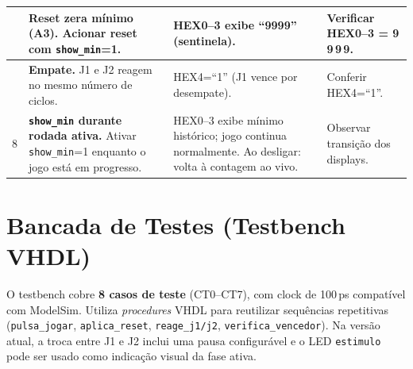 \documentclass[12pt,a4paper]{article}
\begin{document}
\begin{longtable}{>{\centering}p{0.5cm}
                  p{4.1cm} p{4.1cm} p{4.3cm}}
6 & \textbf{Reset zera mínimo (A3).} Acionar reset com
    \texttt{show\_min}=1.
  & HEX0--3 exibe ``9999'' (sentinela).
  & Verificar HEX0--3 = 9\,9\,9\,9. \\
\midrule

7 & \textbf{Empate.} J1 e J2 reagem no mesmo número de ciclos.
  & HEX4=``1'' (J1 vence por desempate).
  & Conferir HEX4=``1''. \\
\midrule

8 & \textbf{\texttt{show\_min} durante rodada ativa.} Ativar
    \texttt{show\_min}=1 enquanto o jogo está em progresso.
  & HEX0--3 exibe mínimo histórico; jogo continua normalmente.
    Ao desligar: volta à contagem ao vivo.
  & Observar transição dos displays. \\

\end{longtable}

\section{Bancada de Testes (Testbench VHDL)}

O testbench cobre \textbf{8 casos de teste} (CT0--CT7), com clock de 100\,ps
compatível com ModelSim. Utiliza \textit{procedures} VHDL para reutilizar
sequências repetitivas (\texttt{pulsa\_jogar}, \texttt{aplica\_reset},
\texttt{reage\_j1/j2}, \texttt{verifica\_vencedor}).
Na versão atual, a troca entre J1 e J2 inclui uma pausa configurável e o
LED \texttt{estimulo} pode ser usado como indicação visual da fase ativa.
\end{document}
